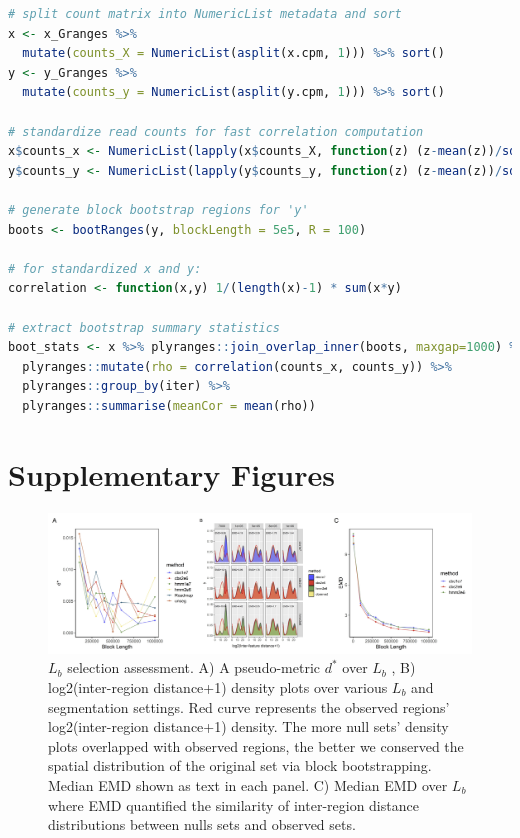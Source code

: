 \documentclass{article}
\begin{document}
\begin{lstlisting}[language=R]
# split count matrix into NumericList metadata and sort
x <- x_Granges %>%
  mutate(counts_X = NumericList(asplit(x.cpm, 1))) %>% sort()
y <- y_Granges %>%
  mutate(counts_y = NumericList(asplit(y.cpm, 1))) %>% sort()

# standardize read counts for fast correlation computation
x$counts_x <- NumericList(lapply(x$counts_X, function(z) (z-mean(z))/sd(z)))
y$counts_y <- NumericList(lapply(y$counts_y, function(z) (z-mean(z))/sd(z)))

# generate block bootstrap regions for 'y'
boots <- bootRanges(y, blockLength = 5e5, R = 100)

# for standardized x and y:
correlation <- function(x,y) 1/(length(x)-1) * sum(x*y)

# extract bootstrap summary statistics
boot_stats <- x %>% plyranges::join_overlap_inner(boots, maxgap=1000) %>%
  plyranges::mutate(rho = correlation(counts_x, counts_y)) %>%
  plyranges::group_by(iter) %>%
  plyranges::summarise(meanCor = mean(rho)) 
\end{lstlisting} 
 
\newpage

\section{Supplementary Figures}

\begin{figure}[htbp]
\centering
\includegraphics[scale=0.35]{Figures/sfig1.jpeg}
\caption{$L_b$ selection assessment. A) A pseudo-metric $d^*$
  \citep{bickel2010subsampling} over $L_b$ , B) 
  log2(inter-region distance+1) density plots over various $L_b$ and
  segmentation settings. Red curve represents the observed regions'
  log2(inter-region distance+1) density. The more 
  null sets' density
  plots overlapped with observed regions, the better we conserved the
  spatial distribution of the original set via block
  bootstrapping. Median EMD shown as text in each panel. C) Median
  EMD over $L_b$ where EMD quantified the similarity of inter-region
  distance distributions between nulls sets and observed sets.}
\label{fig:suppfig0}
\end{figure}
\end{document}
